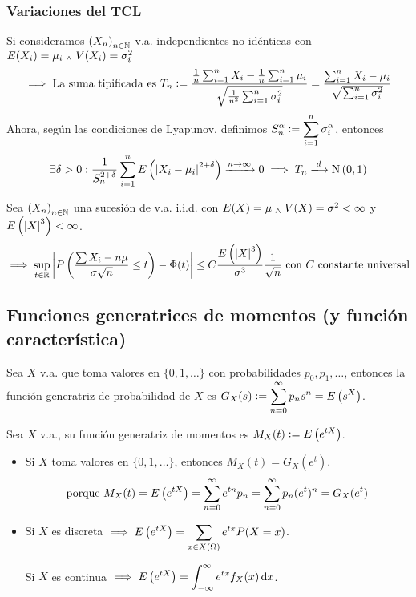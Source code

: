 
\subsubsection{Variaciones del TCL}

Si consideramos $\left(X_n\right)_{n\in \mathbb{N}}$ v.a. independientes no idénticas con $E(X_i) = \mu_i \; _{\wedge} \; V(X_i) = \sigma_i^2$
\[\implies \text{La suma tipificada es } T_n \vcentcolon= \frac{\frac{1}{n} \sum_{i=1}^{n} X_i - \frac{1}{n}\sum_{i=1}^{n} \mu_i}{\sqrt{\frac{1}{n^2}\sum_{i=1}^{n} \sigma_i^2}} = \frac{\sum_{i=1}^{n} X_i - \mu_i}{\sqrt{\sum_{i=1}^{n} \sigma_i^2}}\]
Ahora, según las condiciones de Lyapunov, definimos $\displaystyle S_n^\alpha \vcentcolon= \sum_{i=1}^{n} \sigma_i^\alpha$, entonces
\[\exists \delta > 0 : \frac{1}{S_n^{2+\delta}} \sum_{i=1}^{n} E\left(\abs{X_i - \mu_i}^{2+\delta}\right) \xrightarrow{n\to\infty} 0 \implies T_n \xlongrightarrow{d} \normal{0,1}\]

\begin{teo}
	Sea $\left(X_n\right)_{n\in \mathbb{N}}$ una sucesión de v.a. i.i.d. con $E(X) = \mu \; _{\wedge} \; V(X) = \sigma^2 < \infty$ y $E\left(\left|X\right|^3\right) < \infty$.
	\[\implies \sup_{t\in \mathbb{R}} \left|P\left(\frac{\sum X_i - n\mu}{\sigma \sqrt{n}} \leq t\right) - \Phi(t)\right| \leq C \frac{E\left(\left|X\right|^3\right)}{\sigma^3}\frac{1}{\sqrt{n}} \text{ con } C \text{ constante universal}\]
\end{teo}

\subsection{Funciones generatrices de momentos (y función característica)}

 Sea $X$ v.a. que toma valores en $\{0, 1, \dots\}$ con probabilidades $p_0, p_1, \dots$, entonces la función generatriz de probabilidad de $X$ es $\displaystyle G_X(s) \vcentcolon= \sum_{n=0}^{\infty} p_n s^n = E\left(s^X\right)$.

\begin{defn}
	Sea $X$ v.a., su función generatriz de momentos  es $\displaystyle M_X(t) \vcentcolon= E\left(e^{tX}\right)$.
\end{defn}

\begin{obs}
	\begin{itemize}
		\item Si $X$ toma valores en $\{0, 1, \dots\}$, entonces $M_X(t) = G_X(e^t)$.
		      \[\text{porque }M_X(t) = E\left(e^{tX}\right) = \sum_{n=0}^{\infty} e^{tn}p_n = \sum_{n=0}^{\infty} p_n (e^t)^n = G_X(e^t)\]
		\item Si $X$ es discreta $\displaystyle \implies E\left(e^{tX}\right) = \sum_{x \in X(\Omega)} e^{tx}P(X=x)$.

		      Si $X$ es continua $\ds \implies E\left(e^{tX}\right) = \int_{-\infty}^{\infty} e^{tx}f_X(x)\odif{x}$.
	\end{itemize}
\end{obs}

